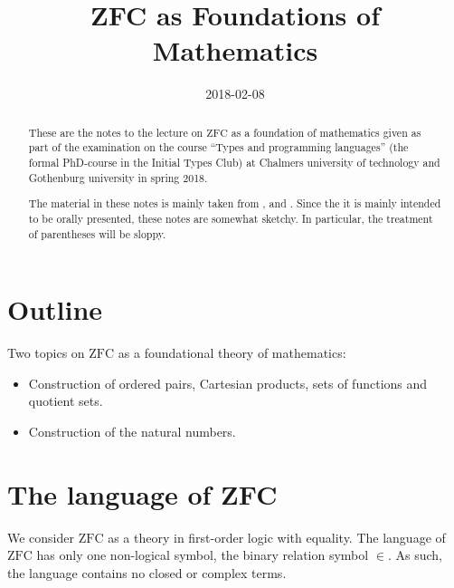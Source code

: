 \documentclass{scrartcl}
\title{ZFC as Foundations of Mathematics}
\date{2018-02-08}
\theoremstyle{definition}
\theoremstyle{plain}
\theoremstyle{remark}
\newcommand{\ZFC}{\ensuremath{\mathrm{ZFC}}}
\begin{document}
\begin{abstract}
  These are the notes to the lecture on $\ZFC$ as a foundation of mathematics given as part of the examination on the course ``Types and programming languages'' (the formal PhD-course in the Initial Types Club) at Chalmers university of technology and Gothenburg university in spring 2018.

  The material in these notes is mainly taken from \cite{jech:2002}, \cite{moschovakis:2006} and \cite{aczel_rathjen:2001}. Since the it is mainly intended to be orally presented, these notes are somewhat sketchy. In particular, the treatment of parentheses will be sloppy.
\end{abstract}

\setcounter{secnumdepth}{0}

\section*{Outline}
\label{sec:outline}

Two topics on $\ZFC$ as a foundational theory of mathematics:
\begin{itemize}
\item Construction of ordered pairs, Cartesian products, sets of functions and quotient sets.
\item Construction of the natural numbers.
\end{itemize}

\setcounter{secnumdepth}{2}

\tableofcontents

\section{The language of ZFC}
\label{sec:lang}

We consider $\ZFC$ as a theory in first-order logic with equality. The language of $\ZFC$ has only one non-logical symbol, the binary relation symbol $\in$. As such, the language contains no closed or complex terms.
\end{document}
